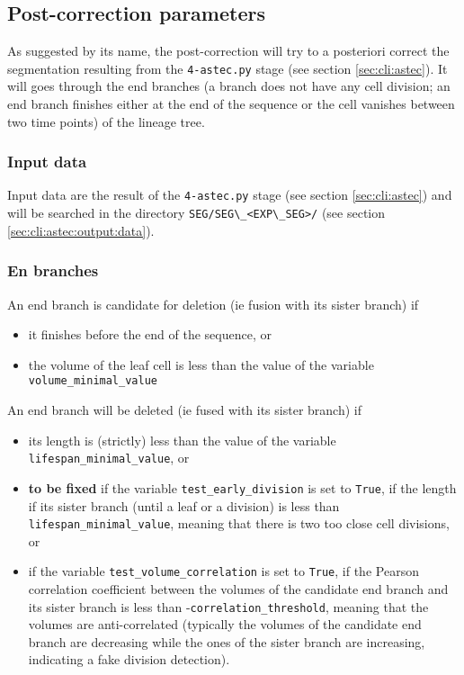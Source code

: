 \subsection{Post-correction parameters}

As suggested by its name, the post-correction will try to a posteriori correct the segmentation resulting from the  \verb|4-astec.py| stage (see section \ref{sec:cli:astec}). It will goes through the end branches (a branch does not have any cell division; an end branch finishes either at the end of the sequence or the cell vanishes between two time points) of the lineage tree.

\subsubsection{Input data}
\label{sec:cli:post:correction:input:data}
Input data are the result of the \verb|4-astec.py| stage (see section \ref{sec:cli:astec}) and will be searched in the directory \verb|SEG/SEG\_<EXP\_SEG>/| (see section \ref{sec:cli:astec:output:data}).

\subsubsection{En branches}
\label{sec:cli:post:correction:end:branches}

An end branch is candidate for deletion (ie fusion with its sister branch) if
\begin{itemize}
\itemsep -0.5ex
\item it finishes before the end of the sequence, or
\item the volume of the leaf cell is less than the value of the variable \texttt{volume\_minimal\_value}
\end{itemize}

An end branch will be deleted (ie fused with its sister branch) if
\begin{itemize}
\itemsep -0.5ex
\item its length is (strictly) less than the value of the variable \texttt{lifespan\_minimal\_value}, or
\item \textbf{to be fixed} if the variable  \texttt{test\_early\_division} is set to \texttt{True}, if the length if its sister branch (until a leaf or a division) is less than \texttt{lifespan\_minimal\_value}, meaning that there is two too close cell divisions, or
\item if the variable \texttt{test\_volume\_correlation} is set to \texttt{True}, if the Pearson correlation coefficient between the volumes of the candidate end branch and its sister branch is less than 
-\texttt{correlation\_threshold}, meaning that the volumes are anti-correlated (typically the volumes of the candidate end branch are decreasing while the ones of the sister branch are increasing, indicating a fake division detection).
\end{itemize}



